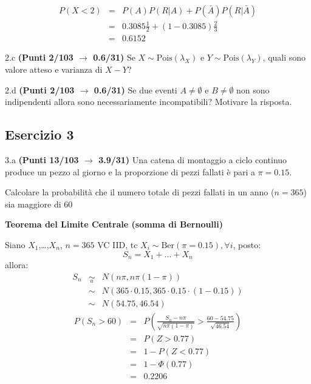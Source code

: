 \documentclass[
  11pt,
]{book}
\theoremstyle{mytheoremstyle}
\theoremstyle{mydefstyle}
\newenvironment{sol}
  {
  \begin{tcolorbox}[enhanced,breakable,arc=0.1mm,boxrule=1pt,colback=white,colframe=iblue,
  title=\bf \fontfamily{lmss}\selectfont \hspace{.5 cm} Soluzione,drop fuzzy shadow]

}{
\end{tcolorbox}
  }
\begin{document}
\begin{sol}
\begin{eqnarray*}
P(X<2) &=& P(A)P(R|A)+P(\bar A)P(R|\bar A)\\
&=& 0.3085\frac 12 + (1-0.3085)\frac 23\\
&=& 0.6152
\end{eqnarray*}

\end{sol}

2.c \textbf{(Punti 2/103 \(\rightarrow\) 0.6/31)} Se \(X\sim\text{Pois}(\lambda_X)\) e \(Y\sim\text{Pois}(\lambda_Y)\), quali sono valore atteso e varianza
di \(X-Y\)?

2.d \textbf{(Punti 2/103 \(\rightarrow\) 0.6/31)} Se due eventi \(A\ne\emptyset\) e \(B\ne\emptyset\) non sono indipendenti allora sono necessariamente incompatibili? Motivare la risposta.

\subsection{Esercizio 3}\label{esercizio-3-29}

3.a \textbf{(Punti 13/103 \(\rightarrow\) 3.9/31)} Una catena di montaggio a ciclo continuo produce un pezzo al giorno e la proporzione di pezzi fallati è pari
a \(\pi=0.15\).

Calcolare la probabilità che il numero totale di pezzi fallati in un anno (\(n=365\)) sia maggiore di 60

\begin{sol}
\textbf{Teorema del Limite Centrale (somma di Bernoulli)}

Siano \(X_1\),\ldots,\(X_n\), \(n=365\) VC IID, tc \(X_i\sim\text{Ber}(\pi=0.15)\)\(,\forall i\), posto:
\[
      S_n = X_1 + ... + X_n
      \]
allora:\begin{eqnarray*}
  S_n & \mathop{\sim}\limits_{a}& N(n\pi,n\pi(1-\pi)) \\
      &\sim & N(365\cdot0.15,365\cdot0.15\cdot(1-0.15)) \\
      &\sim & N(54.75,46.54)
  \end{eqnarray*}\begin{eqnarray*}
      P( S_n   >   60 ) 
        &=& P\left(  \frac { S_n  -  n\pi }{ \sqrt{n\pi(1-\pi)} }  >  \frac { 60  -  54.75 }{\sqrt{ 46.54 }} \right)  \\
                 &=& P\left(  Z   >   0.77 \right) \\    &=& 1-P(Z< 0.77 )\\ 
                 &=&  1-\Phi( 0.77 ) \\ &=&  0.2206 
      \end{eqnarray*}

\end{sol}
\end{document}

